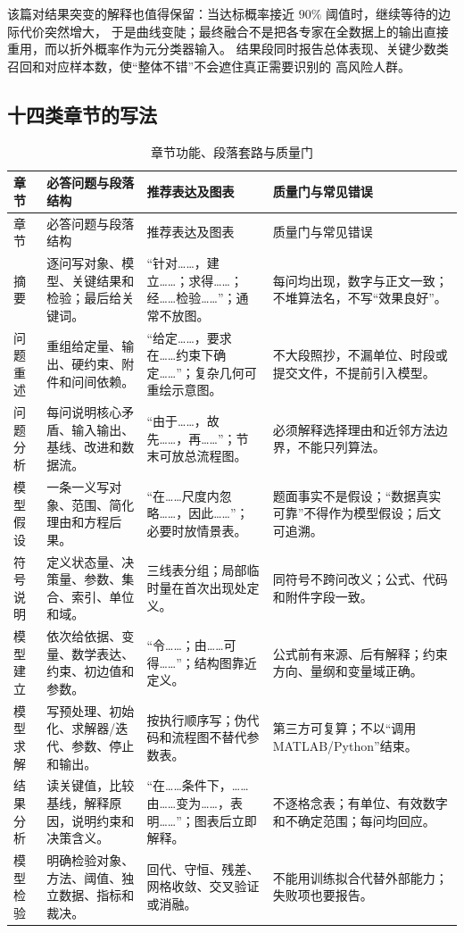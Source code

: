 \documentclass[UTF8,a4paper,12pt]{ctexart}
\begin{document}
该篇对结果突变的解释也值得保留：当达标概率接近 $90\%$ 阈值时，继续等待的边际代价突然增大，
于是曲线变陡；最终融合不是把各专家在全数据上的输出直接重用，而以折外概率作为元分类器输入。
结果段同时报告总体表现、关键少数类召回和对应样本数，使“整体不错”不会遮住真正需要识别的
高风险人群。
\subsection{十四类章节的写法}

\begin{longtable}{p{1.8cm}p{4.2cm}p{4.0cm}p{4.0cm}}
\caption{章节功能、段落套路与质量门}\label{tab:sections}\\
\toprule
章节 & 必答问题与段落结构 & 推荐表达及图表 & 质量门与常见错误\\
\midrule
\endfirsthead
\toprule
章节 & 必答问题与段落结构 & 推荐表达及图表 & 质量门与常见错误\\
\midrule
\endhead
摘要 & 逐问写对象、模型、关键结果和检验；最后给关键词。 & “针对……，建立……；求得……；经……检验……”；通常不放图。 & 每问均出现，数字与正文一致；不堆算法名，不写“效果良好”。\\
问题重述 & 重组给定量、输出、硬约束、附件和问间依赖。 & “给定……，要求在……约束下确定……”；复杂几何可重绘示意图。 & 不大段照抄，不漏单位、时段或提交文件，不提前引入模型。\\
问题分析 & 每问说明核心矛盾、输入输出、基线、改进和数据流。 & “由于……，故先……，再……”；节末可放总流程图。 & 必须解释选择理由和近邻方法边界，不能只列算法。\\
模型假设 & 一条一义写对象、范围、简化理由和方程后果。 & “在……尺度内忽略……，因此……”；必要时放情景表。 & 题面事实不是假设；“数据真实可靠”不得作为模型假设；后文可追溯。\\
符号说明 & 定义状态量、决策量、参数、集合、索引、单位和域。 & 三线表分组；局部临时量在首次出现处定义。 & 同符号不跨问改义；公式、代码和附件字段一致。\\
模型建立 & 依次给依据、变量、数学表达、约束、初边值和参数。 & “令……；由……可得……”；结构图靠近定义。 & 公式前有来源、后有解释；约束方向、量纲和变量域正确。\\
模型求解 & 写预处理、初始化、求解器/迭代、参数、停止和输出。 & 按执行顺序写；伪代码和流程图不替代参数表。 & 第三方可复算；不以“调用 MATLAB/Python”结束。\\
结果分析 & 读关键值，比较基线，解释原因，说明约束和决策含义。 & “在……条件下，……由……变为……，表明……”；图表后立即解释。 & 不逐格念表；有单位、有效数字和不确定范围；每问均回应。\\
模型检验 & 明确检验对象、方法、阈值、独立数据、指标和裁决。 & 回代、守恒、残差、网格收敛、交叉验证或消融。 & 不能用训练拟合代替外部能力；失败项也要报告。\\

\end{longtable}
\end{document}
